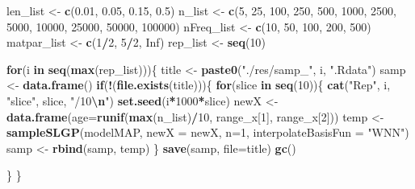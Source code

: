 \documentclass[
]{article}
\newenvironment{Shaded}{\begin{snugshade}}{\end{snugshade}}
\newcommand{\AttributeTok}[1]{\textcolor[rgb]{0.13,0.29,0.53}{#1}}
\newcommand{\ConstantTok}[1]{\textcolor[rgb]{0.56,0.35,0.01}{#1}}
\newcommand{\ControlFlowTok}[1]{\textcolor[rgb]{0.13,0.29,0.53}{\textbf{#1}}}
\newcommand{\DecValTok}[1]{\textcolor[rgb]{0.00,0.00,0.81}{#1}}
\newcommand{\FloatTok}[1]{\textcolor[rgb]{0.00,0.00,0.81}{#1}}
\newcommand{\FunctionTok}[1]{\textcolor[rgb]{0.13,0.29,0.53}{\textbf{#1}}}
\newcommand{\NormalTok}[1]{#1}
\newcommand{\OtherTok}[1]{\textcolor[rgb]{0.56,0.35,0.01}{#1}}
\newcommand{\SpecialCharTok}[1]{\textcolor[rgb]{0.81,0.36,0.00}{\textbf{#1}}}
\newcommand{\StringTok}[1]{\textcolor[rgb]{0.31,0.60,0.02}{#1}}
\begin{document}
\begin{Shaded}
\begin{Highlighting}[]
\NormalTok{len\_list }\OtherTok{\textless{}{-}} \FunctionTok{c}\NormalTok{(}\FloatTok{0.01}\NormalTok{, }\FloatTok{0.05}\NormalTok{, }\FloatTok{0.15}\NormalTok{, }\FloatTok{0.5}\NormalTok{)}
\NormalTok{n\_list }\OtherTok{\textless{}{-}} \FunctionTok{c}\NormalTok{(}\DecValTok{5}\NormalTok{, }\DecValTok{25}\NormalTok{, }\DecValTok{100}\NormalTok{, }
            \DecValTok{250}\NormalTok{, }\DecValTok{500}\NormalTok{, }\DecValTok{1000}\NormalTok{, }
            \DecValTok{2500}\NormalTok{, }\DecValTok{5000}\NormalTok{, }\DecValTok{10000}\NormalTok{, }
            \DecValTok{25000}\NormalTok{, }\DecValTok{50000}\NormalTok{, }\DecValTok{100000}\NormalTok{)}
\NormalTok{nFreq\_list }\OtherTok{\textless{}{-}} \FunctionTok{c}\NormalTok{(}\DecValTok{10}\NormalTok{, }\DecValTok{50}\NormalTok{, }\DecValTok{100}\NormalTok{, }\DecValTok{200}\NormalTok{, }\DecValTok{500}\NormalTok{)}
\NormalTok{matpar\_list }\OtherTok{\textless{}{-}} \FunctionTok{c}\NormalTok{(}\DecValTok{1}\SpecialCharTok{/}\DecValTok{2}\NormalTok{, }\DecValTok{5}\SpecialCharTok{/}\DecValTok{2}\NormalTok{, }\ConstantTok{Inf}\NormalTok{)}
\NormalTok{rep\_list }\OtherTok{\textless{}{-}} \FunctionTok{seq}\NormalTok{(}\DecValTok{10}\NormalTok{)}


\ControlFlowTok{for}\NormalTok{(i }\ControlFlowTok{in} \FunctionTok{seq}\NormalTok{(}\FunctionTok{max}\NormalTok{(rep\_list)))\{}
\NormalTok{  title }\OtherTok{\textless{}{-}} \FunctionTok{paste0}\NormalTok{(}\StringTok{"./res/samp\_"}\NormalTok{, i, }\StringTok{".Rdata"}\NormalTok{)}
\NormalTok{  samp }\OtherTok{\textless{}{-}} \FunctionTok{data.frame}\NormalTok{()}
  \ControlFlowTok{if}\NormalTok{(}\SpecialCharTok{!}\NormalTok{(}\FunctionTok{file.exists}\NormalTok{(title)))\{}
    \ControlFlowTok{for}\NormalTok{(slice }\ControlFlowTok{in} \FunctionTok{seq}\NormalTok{(}\DecValTok{10}\NormalTok{))\{  }
      \FunctionTok{cat}\NormalTok{(}\StringTok{"Rep"}\NormalTok{, i, }\StringTok{"slice"}\NormalTok{, slice, }\StringTok{"/10}\SpecialCharTok{\textbackslash{}n}\StringTok{"}\NormalTok{)}
      \FunctionTok{set.seed}\NormalTok{(i}\SpecialCharTok{*}\DecValTok{1000}\SpecialCharTok{*}\NormalTok{slice)}
\NormalTok{      newX }\OtherTok{\textless{}{-}} \FunctionTok{data.frame}\NormalTok{(}\AttributeTok{age=}\FunctionTok{runif}\NormalTok{(}\FunctionTok{max}\NormalTok{(n\_list)}\SpecialCharTok{/}\DecValTok{10}\NormalTok{, range\_x[}\DecValTok{1}\NormalTok{], range\_x[}\DecValTok{2}\NormalTok{]))}
\NormalTok{      temp }\OtherTok{\textless{}{-}} \FunctionTok{sampleSLGP}\NormalTok{(modelMAP, }
                         \AttributeTok{newX =}\NormalTok{ newX, }
                         \AttributeTok{n=}\DecValTok{1}\NormalTok{, }
                         \AttributeTok{interpolateBasisFun =} \StringTok{"WNN"}\NormalTok{)}
\NormalTok{      samp }\OtherTok{\textless{}{-}} \FunctionTok{rbind}\NormalTok{(samp, temp)}
\NormalTok{    \}}
    \FunctionTok{save}\NormalTok{(samp, }\AttributeTok{file=}\NormalTok{title)}
    \FunctionTok{gc}\NormalTok{()}
    
    
\NormalTok{  \}}
\NormalTok{\}}
\end{Highlighting}
\end{Shaded}
\end{document}
